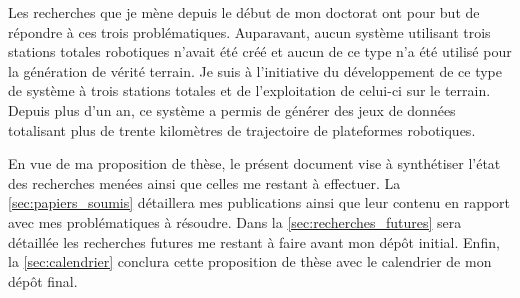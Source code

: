 Les recherches que je mène depuis le début de mon doctorat ont pour but de répondre à ces trois problématiques.
Auparavant, aucun système utilisant trois stations totales robotiques n'avait été créé et aucun de ce type n'a été utilisé pour la génération de vérité terrain.
Je suis à l'initiative du développement de ce type de système à trois stations totales et de l'exploitation de celui-ci sur le terrain.
Depuis plus d'un an, ce système a permis de générer des jeux de données totalisant plus de trente kilomètres de trajectoire de plateformes robotiques.

En vue de ma proposition de thèse, le présent document vise à synthétiser l'état des recherches menées ainsi que celles me restant à effectuer.
La \autoref{sec:papiers_soumis} détaillera mes publications ainsi que leur contenu en rapport avec mes problématiques à résoudre.
Dans la \autoref{sec:recherches_futures} sera détaillée les recherches futures me restant à faire avant mon dépôt initial.
Enfin, la \autoref{sec:calendrier} conclura cette proposition de thèse avec le calendrier de mon dépôt final.